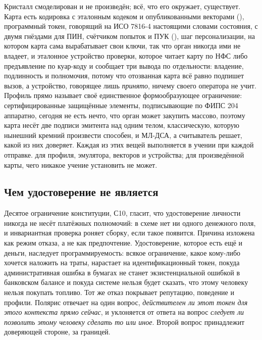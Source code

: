 Кристалл смоделирован и не произведён; всё, что его окружает, существует. Карта есть кодировка с эталонным кодеком и опубликованными векторами
(), программный токен, говорящий на ИСО 7816-4 настоящими
словами состояния, с двумя гнёздами для ПИН, счётчиком попыток и ПУК (), шаг
персонализации, на котором карта сама вырабатывает свои ключи, так что орган никогда ими не
владеет, и эталонное устройство проверки, которое читает карту по НФС либо предъявление по
куар-коду и сообщает три вывода по отдельности: владение, подлинность и полномочия, потому что
отозванная карта всё равно подпишет вызов, а устройство, говорящее лишь \emph{принято}, ничему
своего оператора не учит. Профиль прямо называет своё единственное формообразующее ограничение:
сертифицированные защищённые элементы, подписывающие по ФИПС 204 аппаратно, сегодня не есть
нечто, что орган может закупить массово, поэтому карта несёт две подписи эмитента над одним телом,
классическую, которую нынешний кремний произвести способен, и МЛ-ДСА, а считыватель решает, какой
из них доверяет. Каждая из этих вещей выполняется в учении при каждой отправке. \sImplMark{} для
профиля, эмулятора, векторов и устройства; \sFut{} для произведённой карты, чего никакое учение
установить не может.


\subsection{Чем удостоверение не является}

Десятое ограничение конституции, С10, гласит, что удостоверение личности никогда не несёт
платёжных полномочий: в схеме нет ни одного денежного поля, и инвариантная проверка роняет
сборку, если такое появится. Причина изложена как режим отказа, а не как предпочтение.
Удостоверение, которое есть ещё и деньги, наследует программируемость: всякое ограничение, какое
кому-либо хочется наложить на траты, нарастает на идентификационный токен, покуда
административная ошибка в бумагах не станет экзистенциальной ошибкой в банковском балансе и покуда
системе нельзя будет сказать, что этому человеку нельзя покупать топливо. Тот же отказ покрывает
репутацию, поведение и профили. Полярис отвечает на один вопрос, \emph{действителен ли этот токен
для этого контекста прямо сейчас}, и уклоняется от ответа на вопрос \emph{следует ли позволить
этому человеку сделать то или иное}. Второй вопрос принадлежит доверяющей стороне, за границей. \sImpl

